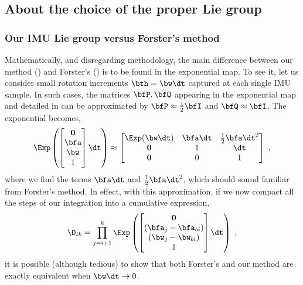 \subsection{About the choice of the proper Lie group}

\subsubsection{Our IMU Lie group versus Forster's method}

Mathematically, and disregarding methodology, the main difference between our method () and Forster's \cite{forster2017-TRO} () is to be found in the exponential map. 
To see it, let us consider small rotation increments $\bth=\bw\dt$ captured at each single IMU sample. 
In such cases, the matrices $\bfP,\bfQ$ appearing in the exponential map  and detailed in  can be approximated by $\bfP\approx\tfrac12\bfI$ and $\bfQ\approx\bfI$.
The exponential becomes,
%
\begin{align}
    \Exp\left(\begin{bmatrix}
    \bf0 \\ \bfa \\ \bw \\ 1
    \end{bmatrix}\dt\right) \approx \begin{bmatrix}
    \Exp(\bw\dt) & \bfa\dt & \tfrac12\bfa\dt^2 \\
    \bf0 & 1 & \dt \\
    \bf0 & 0 & 1
    \end{bmatrix}
~,
\end{align}
%
where we find the terms $\bfa\dt$ and $\tfrac12\bfa\dt^2$, which should sound familiar from Forster's method. 
In effect, with this approximation, if we now compact all the steps  of our integration into a cumulative expression,
%
\begin{align}
    \D_{ik} = \prod_{j=i+1}^k \Exp\left(\begin{bmatrix}
    \bf0 \\ (\bfa_j-\bfa_{bi}) \\ (\bw_j-\bw_{bi}) \\ 1
    \end{bmatrix}\dt\right)
~,
\end{align}
%
it is possible (although tedious) to show that both Forster's and our method are exactly equivalent when $\bw\dt\to0$.

